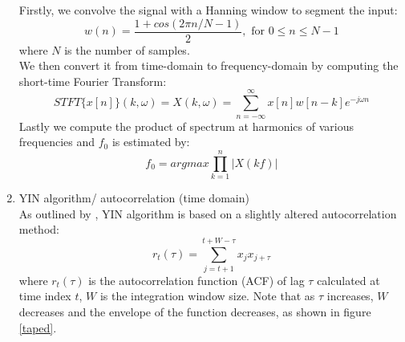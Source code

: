 \begin{enumerate}
	Firstly, we convolve the signal with a Hanning window to segment the input:
	\[w(n) = \frac{1+cos(2\pi n/N-1)}{2}, \text{ for } 0 \leq n \leq N-1\] where $N$ is the number of samples.\\
	We then convert it from time-domain to frequency-domain by computing the short-time Fourier Transform:
	\[STFT \{x[n]\}(k,\omega) = X(k,\omega )= \sum _{n=-\infty }^{\infty }x[n]w[n-k]e^{-j\omega n}\]
	Lastly we compute the product of spectrum at harmonics of various frequencies and $f_0$ is estimated by:
	\[f_0 = argmax\prod_{k=1}^{n}|X(kf)|\] 

	\item YIN algorithm/ autocorrelation (time domain)\\
	As outlined by \cite{yin}, YIN algorithm is based on a slightly altered autocorrelation method:
	\[r_t(\tau)=\sum_{j=t+1}^{t+W-\tau}x_j x_{j+\tau}\]
	where $r_t(\tau)$ is the autocorrelation function (ACF) of lag $\tau$ calculated at time index $t$, $W$ is the integration
	window size. Note that as $\tau$ increases, $W$ decreases and the envelope of the function decreases, as shown in figure 
	\ref{taped}.


\end{enumerate}
